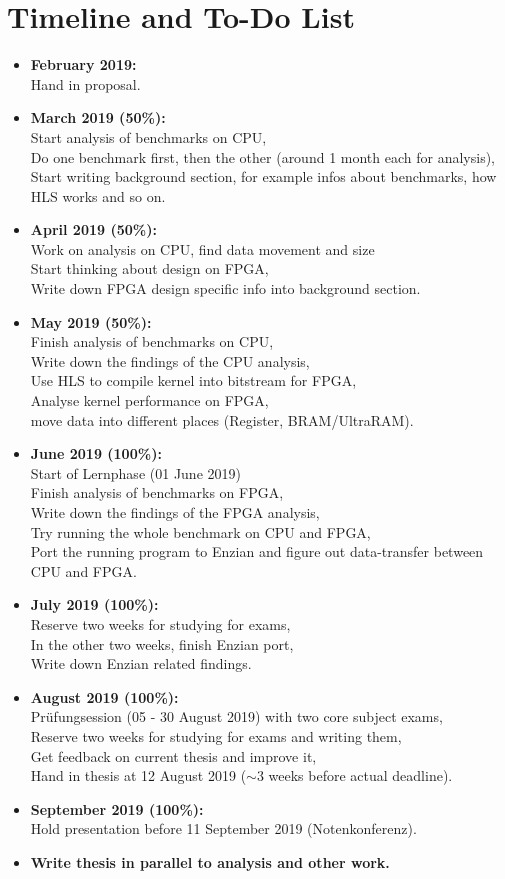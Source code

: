 \documentclass[10pt]{article}
\begin{document}
\section*{Timeline and To-Do List}
\begin{itemize}
\item \textbf{February 2019:}\\
Hand in proposal.
\item \textbf{March 2019 (50\%):}\\
Start analysis of benchmarks on CPU,\\
Do one benchmark first, then the other (around 1 month each for analysis),\\
Start writing background section, for example infos about benchmarks, how HLS works and so on.
\item \textbf{April 2019 (50\%):}\\
Work on analysis on CPU, find data movement and size\\
Start thinking about design on FPGA,\\
Write down FPGA design specific info into background section.
\item \textbf{May 2019 (50\%):}\\
Finish analysis of benchmarks on CPU,\\
Write down the findings of the CPU analysis,\\
Use HLS to compile kernel into bitstream for FPGA,\\
Analyse kernel performance on FPGA,\\
move data into different places (Register, BRAM/UltraRAM).
\item \textbf{June 2019 (100\%):}\\ 
Start of Lernphase (01 June 2019)\\
Finish analysis of benchmarks on FPGA,\\
Write down the findings of the FPGA analysis,\\
Try running the whole benchmark on CPU and FPGA,\\
Port the running program to Enzian and figure out data-transfer between CPU and FPGA.
\item \textbf{July 2019 (100\%):}\\
Reserve two weeks for studying for exams,\\
In the other two weeks, finish Enzian port,\\
Write down Enzian related findings.
\item \textbf{August 2019 (100\%):}\\
Prüfungsession (05 - 30 August 2019) with two core subject exams,\\
Reserve two weeks for studying for exams and writing them,\\
Get feedback on current thesis and improve it,\\
Hand in thesis at 12 August 2019 ($\sim$3 weeks before actual deadline).
\item \textbf{September 2019 (100\%):}\\
Hold presentation before 11 September 2019 (Notenkonferenz).
\item \textbf{Write thesis in parallel to analysis and other work.}
\end{itemize}
\end{document}
